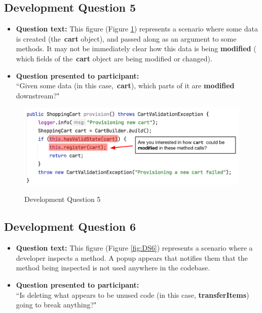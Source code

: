 \subsection{Development Question 5}

\begin{itemize}
  \item[] \textbf{Question text:} This figure (Figure \ref{fig:DS5}) represents 
          a scenario where some data is created (the \textbf{cart} object), and
          passed along as an argument to some methods. It may not be 
          immediately clear how this data is being \textbf{modified} (\eg 
          which fields of the \textbf{cart} object are being modified or changed).
  \item[] \textbf{Question presented to participant:}  \\
          ``Given some data (in this case, \textbf{cart}), which parts of it
          are \textbf{modified} downstream?"
\end{itemize}

\begin{figure}[ht]
\centering
\caption{Development Question 5}
\includegraphics[width=\textwidth]{./figs/ds5.png}
\label{fig:DS5}
\end{figure}

\subsection{Development Question 6}

\begin{itemize}
  \item[] \textbf{Question text:} This figure (Figure \ref{fig:DS6}) represents 
          a scenario where a developer inspects a method. A popup appears that 
          notifies them that the method being inspected is not used anywhere in 
          the codebase.
  \item[] \textbf{Question presented to participant:}  \\
         ``Is deleting what appears to be unused code (in this case, 
         \textbf{transferItems}) going to break anything?"
\end{itemize}

